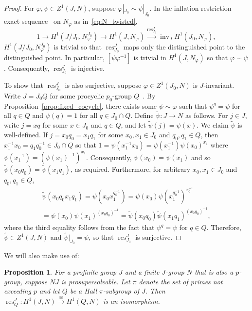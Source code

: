 \documentclass{amsart}
\newtheorem{proposition}[theorem]{Proposition}
\theoremstyle{definition}
\theoremstyle{remark}
\numberwithin{equation}{section}
\newcommand{\iso}{\cong}
\renewcommand{\phi}{\varphi}
\DeclareMathOperator{\inv}{inv}
\DeclareMathOperator{\res}{res}
\begin{document}
\begin{proof}
	For $\phi,\psi \in Z^1(J,N)$, suppose $\phi|_{J_0}\sim \psi|_{J_0}$. In the inflation-restriction exact sequence~\cite[\S{}I.5.8]{Ser02} on $N_\phi$ as in~\eqref{eq:N_twisted},
	\begin{equation*}
		1 \to H^1(J/J_0, N_\phi^{J_0}) \to H^1(J, N_\phi) \xrightarrow{\res^J_{J_0}} \inv_J H^1(J_0, N_\phi),
	\end{equation*}
	$H^1(J/J_0, N_\phi^{J_0})$ is trivial so that $\res^J_{J_0}$ maps only the distinguished point to the distinguished point. In particular, $[\psi\phi^{-1}]$ is trivial in $H^1(J, N_\phi)$ so that $\phi \sim \psi $. Consequently, $\res^J_{J_0}$ is injective.

	To show that $\res^J_{J_0}$ is also surjective, suppose $\phi \in Z^1(J_0, N)$ is $J$-invariant.  Write $J=J_0Q$ for some procyclic $p_0$-group $Q$~\cite[\emph{cf.} Lem.~9.8]{Doe92}. By Proposition~\ref{prop:fixed_cocycle}, there exists some $\psi\sim \phi$ such that $\psi^q=\psi$ for all $q\in Q$ and $\psi(q)=1$ for all $q\in J_0\cap Q$. Define $\tilde\psi: J \to N$ as follows. For $j \in J$, write $j=xq$ for some $x\in J_0$ and $q\in Q$, and let $\tilde\psi(j)=\psi(x)$. We claim $\tilde\psi$ is well-defined. If $j=x_0q_0=x_1q_1$ for some $x_0,x_1 \in J_0$ and $q_0,q_1\in Q$, then $x_1^{-1}x_0=q_1q_0^{-1} \in J_0\cap Q$ so that $1 =\psi(x_1^{-1}x_0) = \psi(x_1^{-1})\psi(x_0)^{x_1}$ where $\psi(x_1^{-1})=(\psi(x_1)^{-1})^{x_1}$. Consequently, $\psi(x_0)=\psi(x_1)$ and so $\tilde\psi(x_0q_0) = \tilde\psi(x_1q_1)$, as required. Furthermore, for arbitrary $x_0,x_1 \in J_0$ and $q_0,q_1\in Q$,
	\begin{multline*}
		\tilde\psi(x_0q_0x_1q_1)  = \psi(x_0x_1^{q_0^{-1}}) = \psi(x_0) \psi(x_1^{q_0^{-1}})^{x_0^{-1}} \\
		= \psi(x_0) \psi(x_1)^{(x_0q_0)^{-1}} = \tilde\psi(x_0q_0)\tilde\psi(x_1q_1)^{(x_0q_0)^{-1}},
	\end{multline*}
	where the third equality follows from the fact that $\psi^q=\psi$ for $q\in Q$. Therefore, $\tilde \psi \in Z^1(J, N)$ and $\tilde\psi|_{J_0} = \psi$, so that $\res^J_{J_0}$ is surjective.
\end{proof}

We will also make use of:

\begin{proposition}
	\label{prop:res_pi}
	For a profinite group $J$ and a finite $J$-group $N$ that is also a $p$-group, suppose $NJ$ is prosupersolvable. Let $\pi$ denote the set of primes not exceeding $p$ and let $Q$ be a Hall $\pi$-subgroup of $J$. Then  $\res^J_Q: H^1(J, N) \xrightarrow\iso H^1(Q, N)$ is an isomorphism.
\end{proposition}
\end{document}
